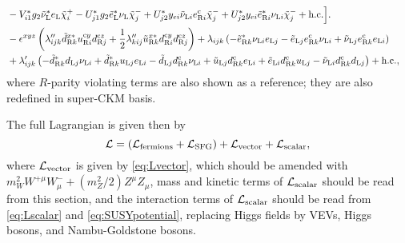\documentclass[CheatSheet]{subfiles}
\begin{document}
\begin{equation}
\begin{split}
  \\&
- V_{i1}^*  g_2 {\tnuL^{*}\eL\charP[i]}
- U_{j1}^* g_2 {\teL^{*}\nuL\charM[j]}
+ U_{j2}^* {\ye[i]\tnuL[i]\eR[i]^{\cc }\charM[j]}
+ U_{j2}^* {\ye[i]\teR[i]^{*}\nuL[i]\charM[j]}
+\text{h.c.}\Bigr].
\\&
  -\nep^{xyz}\left(
    \lambda''_{ijk}\tdR[k]^{x*}\uR[i]^{\cc y}\dR[j]^{\cc z}
  + \frac12\lambda''_{kij}\tuR[k]^{x*}\dR[i]^{\cc y}\dR[j]^{\cc z}
  \right)
 +\lambda_{ijk}\left(
  -\teR[k]^{*}\nuL[i]\eL[j]
  -\teL[j]\eR[k]^{\cc }\nuL[i]
  +\tnuL[j]\eR[k]^{\cc }\eL[i]
 \right)
 \\&
 +\lambda'_{ijk}\left(
  -\tdR[k]^{*}\dL[j]\nuL[i]
  +\tdR[k]^{*}\uL[j]\eL[i]
  -\tdL[j]\dR[k]^{\cc}\nuL[i]
  +\tuL[j]\dR[k]^{\cc}\eL[i]
  +\teL[i]\dR[k]^{\cc}\uL[j]
  -\tnuL[i]\dR[k]^{\cc}\dL[j]
 \right)
+\text{h.c.},
\end{split}
\end{equation}
where $R$-parity violating terms are also shown as a reference; they are also redefined in super-CKM basis.

The full Lagrangian is given then by
\begin{equation}
 \mathcal L = (\mathcal L\w{fermions}+ \mathcal L\w{SFG}) + \mathcal L\w{vector} + \mathcal L\w{scalar},
\end{equation}
where $\mathcal L\w{vector}$ is given by \cref{eq:Lvector}, which should be amended with $m_W^2 W^{+\mu}W^-_\mu+(m_Z^2/2)Z^\mu Z_\mu$,
mass and kinetic terms of $\mathcal L\w{scalar}$ should be read from this section, and the interaction terms of $\mathcal L\w{scalar}$ should be read from \cref{eq:Lscalar} and \cref{eq:SUSYpotential}, replacing Higgs fields by VEVs, Higgs bosons, and Nambu-Goldstone bosons.
\end{document}
